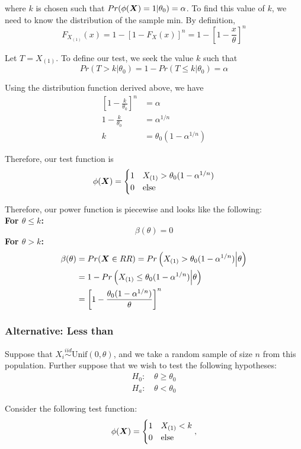 \documentclass[]{article}
\newcommand{\bfX}{\mbox{\boldmath $X$}}
\begin{document}
where $k$ is chosen such that $Pr(\phi(\bfX) = 1|\theta_0) = \alpha$. To find this value of $k$, we need to know the distribution of the sample min. By definition, 
\[
F_{X_{(1)}}(x) = 1 - \left[1 - F_X(x)\right]^n = 1 - \left[1 - \frac{x}{\theta}\right]^n
\]

Let $T = X_{(1)}$. To define our test, we seek the value $k$ such that 
\[
Pr(T > k | \theta_0) = 1 - Pr(T \leq k | \theta_0) = \alpha
\]

Using the distribution function derived above, we have
\[
\begin{split}
\left[1 - \frac{k}{\theta_0}\right]^n &= \alpha \\
1 - \frac{k}{\theta_0} &= \alpha^{1/n} \\
k &= \theta_0(1 - \alpha^{1/n})
\end{split}
\]

Therefore, our test function is
\[
\phi(\bfX) = \begin{cases}
1 & X_{(1)} > \theta_0(1-\alpha^{1/n}) \\
0 & \text{else}
\end{cases}
\]

Therefore, our power function is piecewise and looks like the following:\\
\textbf{For $\theta \leq k$:}
\[
\beta(\theta) = 0
\]
\textbf{For $\theta > k$:}
\[
\begin{split}
\beta(\theta) &= Pr(\bfX \in RR) = Pr\left(X_{(1)} > \theta_0(1-\alpha^{1/n}) \Big| \theta\right) \\
&= 1 - Pr\left(X_{(1)}\leq \theta_0(1-\alpha^{1/n}) \Big| \theta\right) \\
&= \left[1 - \frac{\theta_0(1-\alpha^{1/n})}{\theta}\right]^n
\end{split}
\]

\subsubsection{Alternative: Less than}

Suppose that $X_i \stackrel{iid}{\sim} \text{Unif}(0, \theta)$, and we take a random sample of size $n$ from this population. Further suppose that we wish to test the following hypotheses:
\[
\begin{split}
\text{$H_0$: }& \theta \geq \theta_0 \\
\text{$H_a$: }& \theta < \theta_0
\end{split}
\]

Consider the following test function:
\[
\phi(\bfX) = \begin{cases}
1 & X_{(1)} < k \\
0 & \text{else}
\end{cases},
\]
\end{document}

